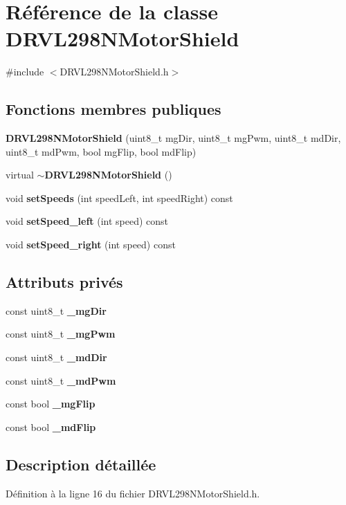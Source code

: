 \section{Référence de la classe D\+R\+V\+L298\+N\+Motor\+Shield}
\label{class_d_r_v_l298_n_motor_shield}


{\ttfamily \#include $<$D\+R\+V\+L298\+N\+Motor\+Shield.\+h$>$}

\subsection*{Fonctions membres publiques}
\begin{DoxyCompactItemize}
\item 
\textbf{ D\+R\+V\+L298\+N\+Motor\+Shield} (uint8\+\_\+t mg\+Dir, uint8\+\_\+t mg\+Pwm, uint8\+\_\+t md\+Dir, uint8\+\_\+t md\+Pwm, bool mg\+Flip, bool md\+Flip)
\item 
virtual \textbf{ $\sim$\+D\+R\+V\+L298\+N\+Motor\+Shield} ()
\item 
void \textbf{ set\+Speeds} (int speed\+Left, int speed\+Right) const
\item 
void \textbf{ set\+Speed\+\_\+left} (int speed) const
\item 
void \textbf{ set\+Speed\+\_\+right} (int speed) const
\end{DoxyCompactItemize}
\subsection*{Attributs privés}
\begin{DoxyCompactItemize}
\item 
const uint8\+\_\+t \textbf{ \+\_\+mg\+Dir}
\item 
const uint8\+\_\+t \textbf{ \+\_\+mg\+Pwm}
\item 
const uint8\+\_\+t \textbf{ \+\_\+md\+Dir}
\item 
const uint8\+\_\+t \textbf{ \+\_\+md\+Pwm}
\item 
const bool \textbf{ \+\_\+mg\+Flip}
\item 
const bool \textbf{ \+\_\+md\+Flip}
\end{DoxyCompactItemize}


\subsection{Description détaillée}


Définition à la ligne 16 du fichier D\+R\+V\+L298\+N\+Motor\+Shield.\+h.



